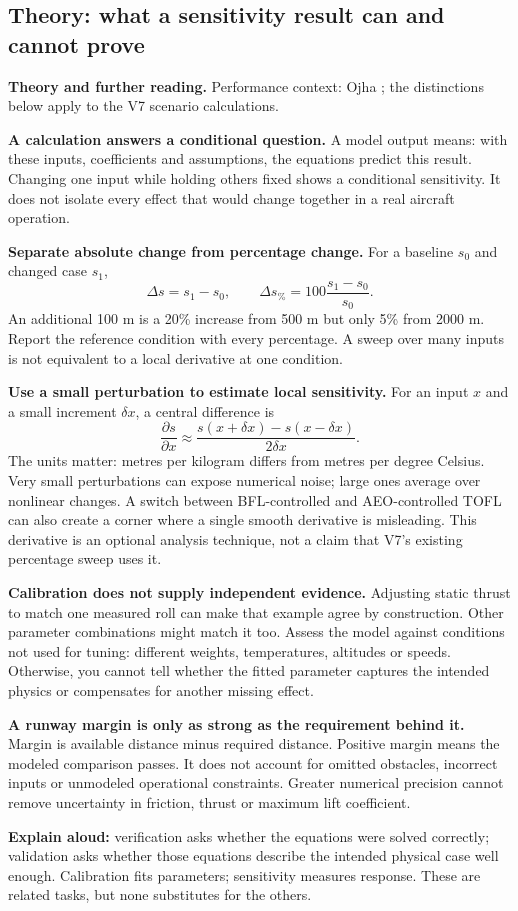 \documentclass[11pt,letterpaper]{article}
\newcommand{\theorypage}[1]{\clearpage\subsection*{\color{navy}\thesection\enspace Theory: #1}}
\newcommand{\reading}[1]{{\small\color{navy}\textbf{Theory and further reading.} #1\par}\vspace{3pt}}
\begin{document}
\theorypage{what a sensitivity result can and cannot prove}
\reading{Performance context: Ojha \cite{ojha}; the distinctions below apply to the V7 scenario calculations.}
\textbf{A calculation answers a conditional question.}
A model output means: with these inputs, coefficients and assumptions, the
equations predict this result. Changing one input while holding others fixed
shows a conditional sensitivity. It does not isolate every effect that would
change together in a real aircraft operation.

\textbf{Separate absolute change from percentage change.}
For a baseline $s_0$ and changed case $s_1$,
\[
\Delta s=s_1-s_0,\qquad
\Delta s_{\%}=100\frac{s_1-s_0}{s_0}.
\]
An additional 100 m is a 20\% increase from 500 m but only 5\% from 2000 m.
Report the reference condition with every percentage. A sweep over many inputs
is not equivalent to a local derivative at one condition.

\textbf{Use a small perturbation to estimate local sensitivity.}
For an input $x$ and a small increment $\delta x$, a central difference is
\[
\frac{\partial s}{\partial x}\approx
\frac{s(x+\delta x)-s(x-\delta x)}{2\delta x}.
\]
The units matter: metres per kilogram differs from metres per degree Celsius.
Very small perturbations can expose numerical noise; large ones average over
nonlinear changes. A switch between BFL-controlled and AEO-controlled TOFL can
also create a corner where a single smooth derivative is misleading.
This derivative is an optional analysis technique, not a claim that V7's
existing percentage sweep uses it.

\textbf{Calibration does not supply independent evidence.}
Adjusting static thrust to match one measured roll can make that example agree
by construction. Other parameter combinations might match it too. Assess the
model against conditions not used for tuning: different weights, temperatures,
altitudes or speeds. Otherwise, you cannot tell whether the fitted parameter
captures the intended physics or compensates for another missing effect.

\textbf{A runway margin is only as strong as the requirement behind it.}
Margin is available distance minus required distance. Positive margin means the
modeled comparison passes. It does not account for omitted obstacles, incorrect
inputs or unmodeled operational constraints. Greater numerical precision cannot
remove uncertainty in friction, thrust or maximum lift coefficient.

\begin{keyidea}
\textbf{Explain aloud:} verification asks whether the equations were solved
correctly; validation asks whether those equations describe the intended physical
case well enough. Calibration fits parameters; sensitivity measures response.
These are related tasks, but none substitutes for the others.
\end{keyidea}
\end{document}
